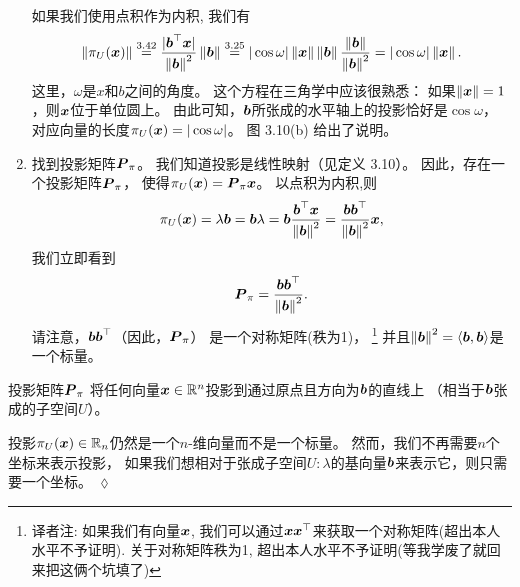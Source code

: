 \begin{enumerate}
          如果我们使用点积作为内积, 我们有
          \begin{equation}
              \left\|\pi_U(\boldsymbol{x})\right\|
              \overset{3.42}{=}
              \frac{|\boldsymbol{b}^\top\boldsymbol{x}|}{\left\|\boldsymbol{b}\right\|^2}\left\|\boldsymbol{b}\right\|
              \overset{3.25}{=}
              |\cos \omega|
              \left\|\boldsymbol{x}\right\| \left\|\boldsymbol{b}\right\|
              \frac{\left\|\boldsymbol{b}\right\|}{\left\|\boldsymbol{b}\right\|^2} =
              |\cos \omega|\left\|\boldsymbol{x}\right\|.
          \end{equation}
          这里，$\omega$是$x$和$b$之间的角度。
          这个方程在三角学中应该很熟悉：
          如果$\|\boldsymbol{x}\| = 1$，则$\boldsymbol{x}$位于单位圆上。
          由此可知，$\boldsymbol{b}$所张成的水平轴上的投影恰好是$\cos \omega$，
          对应向量的长度$\pi_U (\boldsymbol{x}) = |\cos \omega|$。
          图 3.10(b) 给出了说明。
    \item 找到投影矩阵$\boldsymbol{P}_\pi$。
          我们知道投影是线性映射（见定义 3.10）。
          因此，存在一个投影矩阵$\boldsymbol{P}_\pi$，
          使得$\pi_U(\boldsymbol{x})=\boldsymbol{P}_\pi\boldsymbol{x}$。
          以点积为内积,则
          \begin{equation}
              \pi_U(\boldsymbol{x}) = \lambda\boldsymbol{b} = \boldsymbol{b}\lambda =
              \boldsymbol{b} \frac{\boldsymbol{b}^\top\boldsymbol{x}}{\left\|\boldsymbol{b}\right\|^2} =
              \frac{\boldsymbol{b}\boldsymbol{b}^\top}{\left\|\boldsymbol{b}\right\|^2}\boldsymbol{x},
          \end{equation}
          我们立即看到
          \begin{equation}
              \boldsymbol{P}_\pi = \frac{\boldsymbol{b}\boldsymbol{b}^\top}{\left\|\boldsymbol{b}\right\|^2}.
          \end{equation}
          请注意，$\boldsymbol{b}\boldsymbol{b}^\top$（因此，$\boldsymbol{P}_\pi$）
          是一个对称矩阵(秩为1)，
          \footnote{
              译者注: 如果我们有向量$\boldsymbol{x}$, 我们可以通过$\boldsymbol{x}\boldsymbol{x}^\top$来获取一个对称矩阵(超出本人水平不予证明).
              关于对称矩阵秩为1, 超出本人水平不予证明(等我学废了就回来把这俩个坑填了)
          }
          并且$\left\|\boldsymbol{b}\right\|^2 = \left\langle\boldsymbol{b},\boldsymbol{b}\right\rangle$是一个标量。
\end{enumerate}
投影矩阵$\boldsymbol{P}_\pi$
将任何向量$\boldsymbol{x} \in \mathbb{R}^n$投影到通过原点且方向为$\boldsymbol{b}$的直线上
（相当于$\boldsymbol{b}$张成的子空间$U$）。
\begin{remark}
    投影$\pi_U(\boldsymbol{x}) \in \mathbb{R}_n$仍然是一个$n$-维向量而不是一个标量。
    然而，我们不再需要$n$个坐标来表示投影，
    如果我们想相对于张成子空间$U: \lambda$的基向量$\boldsymbol{b}$来表示它，则只需要一个坐标。
    \hfill $\lozenge$
\end{remark}


